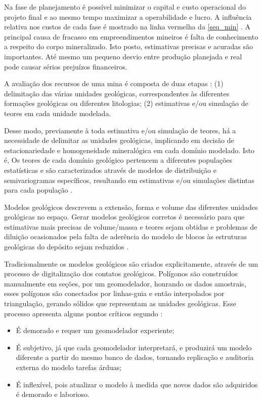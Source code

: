 Na fase de planejamento é possível  minimizar o capital e custo operacional do projeto final e ao mesmo tempo maximizar a operabilidade e lucro. A influência relativa nos custos de cada fase é mostrado na linha vermelha da \autoref{seq_min} \cite{hustrulid2013open}. A principal causa de fracasso em empreendimentos mineiros é falta de conhecimento a respeito do corpo mineralizado. Isto posto, estimativas precisas e acuradas são importantes. Até mesmo um pequeno desvio entre produção planejada e real pode causar sérios prejuízos financeiros.
 
A avaliação dos recursos de uma mina é composta de duas etapas \cite{chiles2004modelling}: (1) delimitação das várias unidades geológicas, correspondentes às diferentes formações geológicas ou diferentes litologias; (2) estimativas e/ou simulação de teores em cada unidade modelada.

Desse modo, previamente à toda estimativa e/ou simulação de teores, há a necessidade de delimitar as unidades geológicas, implicando em decisão de estacionariedade e homogeneidade mineralógica em cada domínio modelado. Isto é, Os teores de cada domínio geológico pertencem a diferentes populações estatísticas e são caracterizados através de modelos de distribuição e semivariogramas específicos, resultando em estimativas e/ou simulações distintas para cada população \cite{mclennan}.

Modelos geológicos descrevem a extensão, forma e volume das diferentes unidades geológicas no espaço. Gerar modelos geológicos corretos é necessário para que estimativas mais precisas de volume/massa e teores sejam obtidas e problemas de diluição ocasionados pela falta de aderência do modelo de blocos às estruturas geológicas do depósito sejam reduzidos \cite{rasera2014estrati}.

Tradicionalmente os modelos geológicos são criados explicitamente, através de um processo de digitalização dos contatos geológicos. Polígonos são construídos manualmente em seções, por um geomodelador, honrando os dados amostrais, esses polígonos são conectados por linhas-guia e então interpolados por triangulação, gerando sólidos que representam as unidades geológicas. Esse processo apresenta alguns pontos críticos segundo :
\begin{itemize}
\item É demorado e requer um geomodelador experiente; 
\item É subjetivo, já que cada geomodelador interpretará, e produzirá um modelo diferente a partir do mesmo banco de dados, tornando replicação e auditoria externa do modelo tarefas árduas;
\item  É inflexível, pois atualizar o modelo à medida que novos dados são adquiridos é demorado e laborioso. 
\end{itemize}

